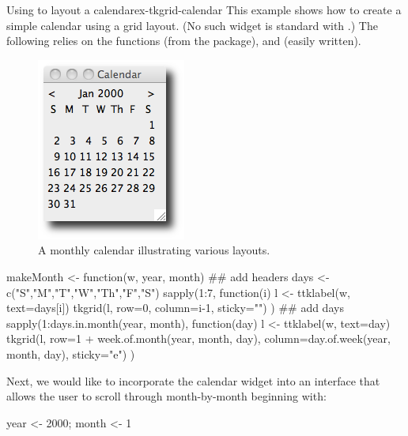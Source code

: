 \begin{example}{Using  to layout a calendar}{ex-tkgrid-calendar}
This example shows how to create a simple calendar using a grid
layout. (No such widget is standard with .) The following relies on
the functions  (from the  package),
 and  (easily
written).




\begin{figure}
  \centering
  \includegraphics[width=.4\textwidth]{fig-tcltk-grid-calendar}
  \caption{A monthly calendar illustrating various layouts.}
  \label{fig:qt-gridlayout-calendar}
\end{figure}


\begin{Schunk}
\begin{Sinput}
 makeMonth <- function(w, year, month) {
   ## add headers
   days <- c("S","M","T","W","Th","F","S")
   sapply(1:7, function(i) {
     l <- ttklabel(w, text=days[i])       
     tkgrid(l, row=0, column=i-1, sticky="")
   })
   ## add days
   sapply(1:days.in.month(year, month),  function(day) {
     l <- ttklabel(w, text=day)
     tkgrid(l, row=1 + week.of.month(year, month, day),
            column=day.of.week(year, month, day),
            sticky="e")
   })
 }
\end{Sinput}
\end{Schunk}

Next, we would like to incorporate the calendar widget into an interface
that allows the user to scroll through month-by-month beginning with:
\begin{Schunk}
\begin{Sinput}
 year <- 2000; month <- 1
\end{Sinput}
\end{Schunk}


\end{example}

